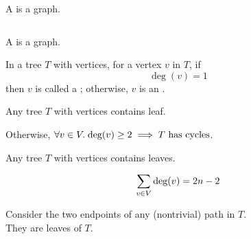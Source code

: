 
\begin{frame}{}
  \begin{definition}[Tree (树)]
    A  is a    graph.
  \end{definition}

  \pause
  \begin{columns}
  \end{columns}

  \pause
  \vspace{0.30cm}

  \pause
  \begin{definition}[Forest (森林)]
    A  is a   graph.
  \end{definition}
\end{frame}

\begin{frame}{}
  \begin{definition}
    In a tree $T$ with  vertices, for a vertex $v$ in $T$, if
    \[
      \deg(v) = 1
    \]
    then $v$ is called a ;
    otherwise, $v$ is an .
  \end{definition}

  \pause
  \vspace{0.30cm}

  \pause
  \begin{lemma}
    Any tree $T$ with  vertices contains  leaf.
  \end{lemma}

  \pause
  \begin{center}
    Otherwise, $\forall v \in V.\; \text{deg}(v) \ge 2 \implies T \text{ has cycles}$.
  \end{center}
\end{frame}

\begin{frame}{}
  \begin{lemma}
    Any tree $T$ with  vertices contains  leaves.
  \end{lemma}

  \pause
  \vspace{0.30cm}
  \[
    \sum_{v \in V} \text{deg}(v) = 2n - 2
  \]

  \pause
  \vspace{0.50cm}
  \begin{center}
    Consider the two endpoints of any  (nontrivial) path in $T$.
    \pause \\[5pt]
    They are leaves of $T$.
  \end{center}
\end{frame}

